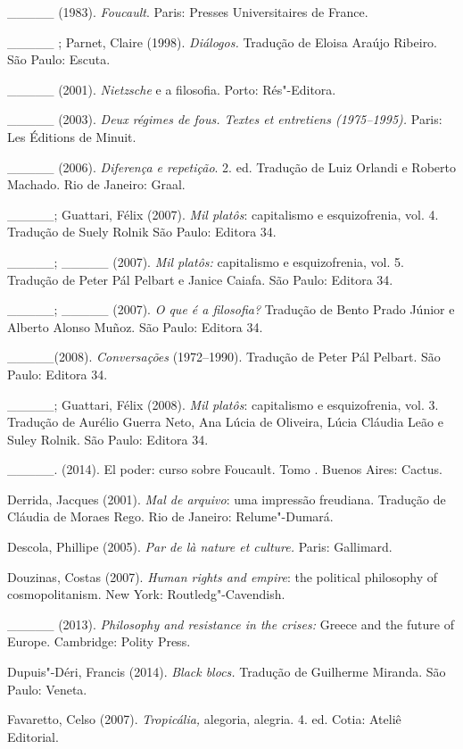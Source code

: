 \_\_\_\_\_ (1983). \emph{Foucault}. Paris: Presses Universitaires de
France.

\_\_\_\_\_ ; Parnet, Claire (1998). \emph{Diálogos.} Tradução de Eloisa
Araújo Ribeiro. São Paulo: Escuta.

\_\_\_\_\_ (2001). \emph{Nietzsche} e a filosofia. Porto: Rés"-Editora.

\_\_\_\_\_ (2003). \emph{Deux régimes de fous. Textes et entretiens
(1975--1995). }Paris: Les Éditions de Minuit.

\_\_\_\_\_ (2006). \emph{Diferença e repetição}. 2. ed. Tradução de Luiz
Orlandi e Roberto Machado. Rio de Janeiro: Graal.

\_\_\_\_\_; Guattari, Félix (2007). \emph{Mil platôs}: capitalismo e
esquizofrenia, vol. 4. Tradução de Suely Rolnik São Paulo: Editora 34.

\_\_\_\_\_; \_\_\_\_\_ (2007). \emph{Mil platôs: }capitalismo e
esquizofrenia, vol. 5. Tradução de Peter Pál Pelbart e Janice Caiafa.
São Paulo: Editora 34.

\_\_\_\_\_; \_\_\_\_\_ (2007). \emph{O que é a filosofia? }Tradução de
Bento Prado Júnior e Alberto Alonso Muñoz. São Paulo: Editora 34.

\_\_\_\_\_(2008). \emph{Conversações} (1972--1990). Tradução de Peter Pál
Pelbart. São Paulo: Editora 34.

\_\_\_\_\_; Guattari, Félix (2008). \emph{Mil platôs}: capitalismo e
esquizofrenia, vol. 3. Tradução de Aurélio Guerra Neto, Ana Lúcia de
Oliveira, Lúcia Cláudia Leão e Suley Rolnik. São Paulo: Editora 34.

\_\_\_\_\_. (2014). El poder: curso sobre Foucault. Tomo . Buenos
Aires: Cactus.

Derrida, Jacques (2001). \emph{Mal de arquivo}: uma impressão freudiana.
Tradução de Cláudia de Moraes Rego. Rio de Janeiro: Relume"-Dumará.

Descola, Phillipe (2005). \emph{Par de là nature et culture. }Paris:
Gallimard.

Douzinas, Costas (2007). \emph{Human rights and empire}: the political
philosophy of cosmopolitanism. New York: Routledg"-Cavendish.

\_\_\_\_\_ (2013). \emph{Philosophy and resistance in the crises:
}Greece and the future of Europe. Cambridge: Polity Press.

Dupuis"-Déri, Francis (2014). \emph{Black blocs. }Tradução de Guilherme
Miranda. São Paulo: Veneta.

Favaretto, Celso (2007). \emph{Tropicália, }alegoria, alegria. 4. ed.
Cotia: Ateliê Editorial.


